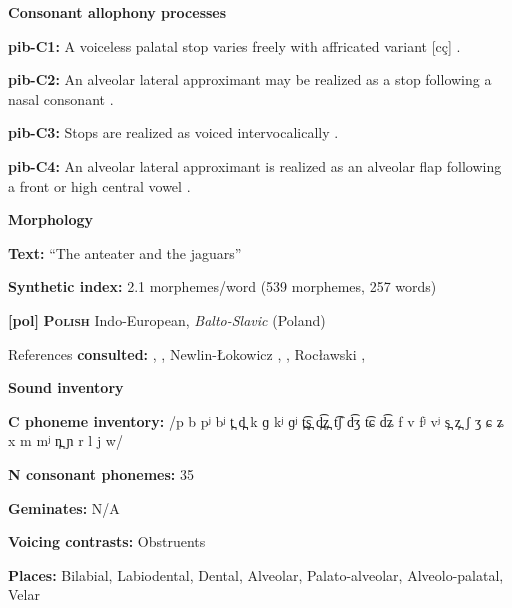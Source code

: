 \textbf{Consonant allophony processes}



\textbf{pib-C1:} A voiceless palatal stop varies freely with affricated variant [cç] \citep[17]{Hanson2010}.



\textbf{pib-C2:} An alveolar lateral approximant may be realized as a stop following a nasal consonant \citep[24]{Hanson2010}.



\textbf{pib-C3:} Stops are realized as voiced intervocalically \citep[17]{Hanson2010}.



\textbf{pib-C4:} An alveolar lateral approximant is realized as an alveolar flap following a front or high central vowel \citep[24]{Hanson2010}.



\textbf{Morphology}



\textbf{Text:} “The anteater and the jaguars” \citep[379-386]{Hanson2010}



\textbf{Synthetic index:} 2.1 morphemes/word (539 morphemes, 257 words)



\textbf{[pol]}   \textbf{\textsc{Polish}}  Indo-European, \textit{Balto-Slavic} (Poland)



References \textbf{consulted:} \citet{Gussman2007}, \citet{Jassem2003}, Newlin-Łokowicz , \citet{Nowak2006}, Rocławski , \citet{Zydorowicz2010}



\textbf{Sound inventory}



\textbf{C phoneme inventory:} /p b pʲ bʲ t̪ d̪ k ɡ kʲ ɡʲ t̪͡s̪ d̪͡z̪ t͡ʃ d͡ʒ t͡ɕ d͡ʑ f v fʲ vʲ s̪ z̪ ʃ ʒ ɕ ʑ x m mʲ n̪ ɲ r l j w/



\textbf{N consonant phonemes:} 35



\textbf{Geminates:} N/A



\textbf{Voicing contrasts:} Obstruents



\textbf{Places:} Bilabial, Labiodental, Dental, Alveolar, Palato-alveolar, Alveolo-palatal, Velar



